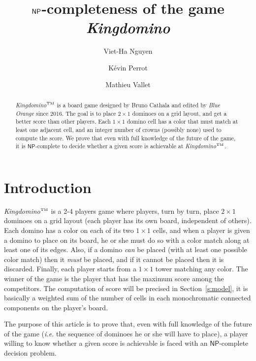 \documentclass[11pt,a4paper]{article}
\title{$\NP$-completeness of the game {\em Kingdomino\tm}}
\author[2]{Viet-Ha Nguyen}
\author[1]{K\'evin Perrot}
\author[3]{Mathieu Vallet}
\affil[1]{Universit\'e publique}
\affil[2]{Univ. C{\^o}te d'Azur, CNRS, Inria, I3S, UMR 7271, Sophia Antipolis, France}
\affil[3]{Aix Marseille Univ., Univ. Toulon, CNRS, LIS, UMR 7020, Marseille, France}
\date{}%
\newcommand{\1}{\mathbb{1}}
\newcommand{\0}{\mathbb{0}}
\newcommand{\NP}{{\mathsf{NP}}}
\newcommand{\tm}{$^\text{\tiny TM}$}
\begin{document}
\renewcommand{\labelitemi}{$\circ$}
\renewcommand{\labelitemii}{$\circ$}
\maketitle

\begin{abstract}
  {\em Kingdomino\tm} is a board game designed by Bruno Cathala and edited by
  {\em Blue Orange} since 2016. The goal is to place $2 \times 1$ dominoes
  on a grid layout,
  and get a better score than other players.
  Each $1 \times 1$ domino cell has a color
  that must match at least one adjacent cell,
  and an integer number of crowns (possibly none) used to compute the score.
  We prove that even with full knowledge of the future of the game,
  it is $\NP$-complete to decide whether a given score is
  achievable at {\em Kingdomino\tm}.
\end{abstract}

\section{Introduction}
\label{s:intro}

{\em Kingdomino\tm} is a 2-4 players game where players, turn by turn, place $2
\times 1$ dominoes on a grid layout (each player has its own board, independent
of others). Each domino has a color on each of its two $1 \times 1$ cells, and
when a player is given a domino to place on its board, he or she must do so
with a color match along at least one of its edges. Also, if a domino {\em can}
be placed (with at least one possible color match) then it {\em must} be
placed, and if it cannot be placed then it is discarded.
Finally, each player starts from a $1 \times 1$ tower matching any
color. The winner of the game is the player that has the maximum score among
the competitors. The computation of score will be precised in
Section~\ref{s:model}, it is basically a weighted sum of the number of cells in
each monochromatic connected components on the player's board.

The purpose of this article is to prove that, even with full knowledge of the
future of the game ({\em i.e.} the sequence of dominoes he or she will have to
place), a player willing to know whether a given score is achievable
is faced with an $\NP$-complete decision problem.
\end{document}
